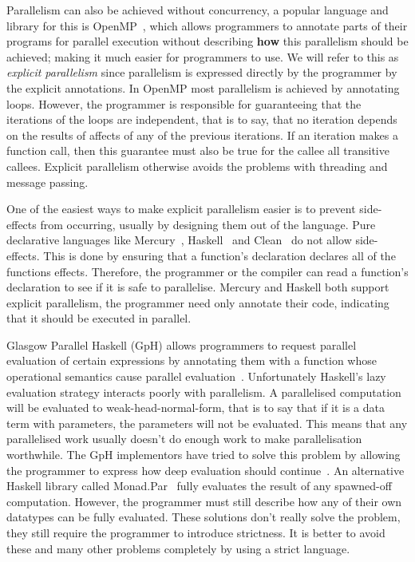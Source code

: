 Parallelism can also be achieved without concurrency,
a popular language and library for this is OpenMP~\citep{openmp},
which allows programmers to annotate parts of their programs for parallel
execution without describing \textbf{how} this parallelism should be achieved;
making it much easier for programmers to use.
We will refer to this as \emph{explicit parallelism}
since parallelism is expressed directly by the programmer by the explicit
annotations.
In OpenMP most parallelism is achieved by annotating loops.
However,
the programmer is responsible for guaranteeing that the iterations of the loops
are independent,
that is to say, that no iteration depends on the results of affects of any of
the previous iterations.
If an iteration makes a function call, then this guarantee must also be true for
the callee all transitive callees.
Explicit parallelism otherwise avoids the problems with threading and message
passing.

One of the easiest ways to make explicit parallelism easier is to prevent
side-effects from occurring, usually by designing them out of the language.
Pure declarative languages like Mercury~\citep{mercury_jlp},
Haskell~\citep{haskell98} and Clean~\citep{1991:concurrent-clean} do not
allow side-effects.
This is done by ensuring that a function's declaration declares all of the
functions effects.
Therefore,
the programmer or the compiler can read a function's declaration to see if it
is safe to parallelise.
Mercury and Haskell both support explicit parallelism,
the programmer need only annotate their code, indicating that it should be
executed in parallel.

Glasgow Parallel Haskell (GpH) allows programmers to request parallel
evaluation of certain expressions by annotating them with a function
whose operational semantics cause parallel
evaluation~\citep{gph,loidi:2008:gph-semiexplicit-parallelism}.
Unfortunately Haskell's lazy evaluation strategy interacts poorly with
parallelism.
A parallelised computation will be evaluated to weak-head-normal-form,
that is to say that if it is a data term with parameters,
the parameters will not be evaluated.
This means that any parallelised work usually doesn't do enough work to
make parallelisation worthwhile.
The GpH implementors have tried to solve this problem by allowing
the programmer to express how deep evaluation should
continue~\citep{trinder:98:strategies}.
An alternative Haskell library called Monad.Par~\citep{marlow:monadpar}
fully evaluates the result of any spawned-off computation.
However, the programmer must still describe how any of their own
datatypes can be fully evaluated.
These solutions don't really solve the problem,
they still require the programmer to introduce strictness.
It is better to avoid these and many other problems completely by using
a strict language.

